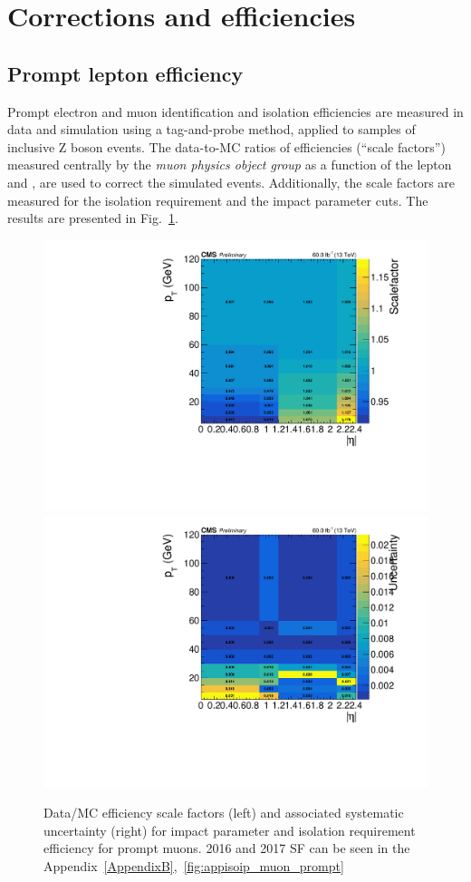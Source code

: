 \clearpage
\section{Corrections and efficiencies}\label{sec:llcorrection_efficiencies}

\subsection{Prompt lepton efficiency} \label{sec:promptleptoneff}
Prompt electron and muon identification and isolation efficiencies
are measured in data and simulation using a tag-and-probe method,
applied to samples of inclusive Z boson events.
The data-to-MC ratios of efficiencies (``scale factors'')
measured centrally by the \emph{muon physics object group} as a function of the lepton \pt and \sigeta, are
used to correct the simulated events. Additionally, the scale factors
are measured for the isolation requirement and the impact
parameter cuts. The results are presented in
Fig.~\ref{fig:isoip_muon_prompt}.
\begin{figure}[h]
  \centering
  \includegraphics[width=.48\textwidth]{Figures/c6/efficiencies/muons/2018/isoip_prompt_sf_2018.pdf}
\hfill{}
  \includegraphics[width=.48\textwidth]{Figures/c6/efficiencies/muons/2018/isoip_prompt_syst_2018.pdf}
  \caption{Data/MC efficiency scale factors (left) and associated
  systematic uncertainty (right) for impact parameter and isolation requirement efficiency
  for prompt muons. 2016 and 2017 SF can be seen in the
  Appendix~\ref{AppendixB},~\ref{fig:appisoip_muon_prompt}}
  \label{fig:isoip_muon_prompt}
\end{figure}

